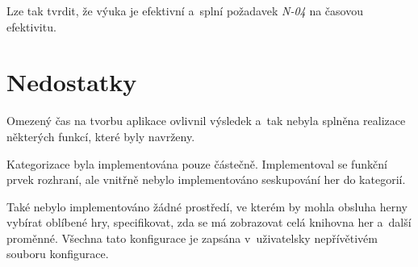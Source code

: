 Lze tak tvrdit, že výuka je efektivní a~splní požadavek \emph{N-04} na
časovou efektivitu.

\newpage

\section{Nedostatky}\label{nedostatky}

Omezený čas na tvorbu aplikace ovlivnil výsledek a~tak nebyla splněna realizace
některých funkcí, které byly navrženy.

Kategorizace byla implementována pouze částečně. Implementoval se funkční
prvek rozhraní, ale vnitřně nebylo implementováno seskupování her do kategorií.

Také nebylo implementováno žádné prostředí, ve kterém by mohla obsluha herny
vybírat oblíbené hry, specifikovat, zda se má zobrazovat celá knihovna her
a~další proměnné. Všechna tato konfigurace je zapsána
v~uživatelsky nepřívětivém souboru konfigurace.
